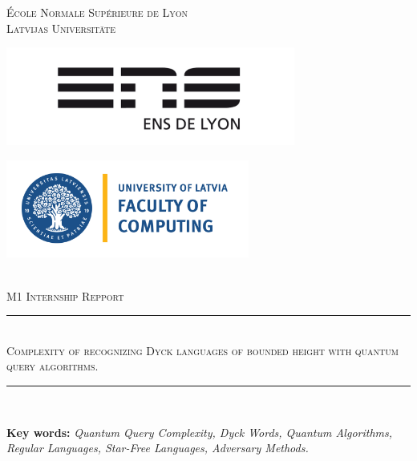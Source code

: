 \documentclass[11pt,a4paper]{article}
\newcommand{\HRule}{\rule{\linewidth}{0.5mm}}
\theoremstyle{definition}
\theoremstyle{plain}
\theoremstyle{definition}
\begin{document}
\begin{titlepage}
    \begin{sffamily}
        \begin{center}

            \textsc{\LARGE École Normale Supérieure de Lyon}\\[0.5cm]
            \textsc{\LARGE Latvijas Universitāte} \\[1cm]

            \begin{minipage}[c]{.46\linewidth}
                \hspace{-2cm}
                \includegraphics[width=9.5cm]{illustration/Logo_ENS_Lyon.png}
            \end{minipage}
            \hfill%
            \begin{minipage}[c]{.46\linewidth}
                \centering
                \includegraphics[width=8cm]{illustration/Faculty_of_Computing_University_of_Latvia-1536x619-1.png}
            \end{minipage}\\[1cm]

            \textsc{\Large M1 Internship Repport}\\[1cm]

            \HRule \\[0.4cm]
            \textsc{\huge Complexity of recognizing Dyck languages
                of bounded height with quantum query algorithms.}
            \HRule \\[1cm]

            \begin{center}
                \textbf{Key words:} \textit{Quantum Query Complexity, Dyck Words,
                    Quantum Algorithms, Regular Languages, Star-Free Languages,
                    Adversary Methods.}
            \end{center}


\end{center}
\end{sffamily}
\end{titlepage}
\end{document}
